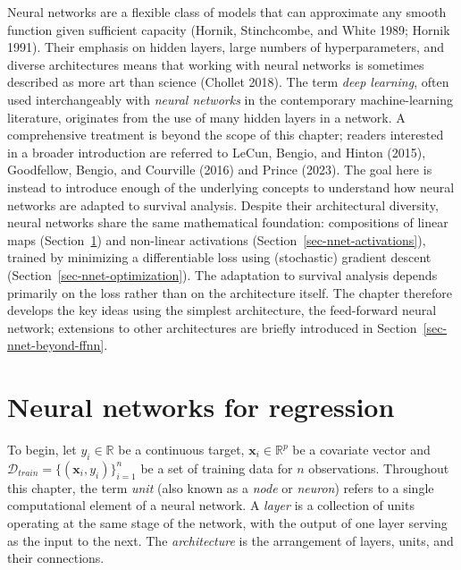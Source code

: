 \documentclass[
  letterpaper,
  krantz2]{style/krantz}
\begin{document}
Neural networks are a flexible class of models
that can approximate any smooth function given sufficient capacity
(Hornik, Stinchcombe, and White 1989; Hornik 1991). Their emphasis on
hidden layers, large numbers of hyperparameters, and diverse
architectures means that working with neural networks is sometimes
described as more art than science (Chollet 2018). The term \emph{deep
learning}, often used interchangeably with \emph{neural networks} in the
contemporary machine-learning literature, originates from the use of
many hidden layers in a network. A comprehensive treatment is beyond the
scope of this chapter; readers interested in a broader introduction are
referred to LeCun, Bengio, and Hinton (2015), Goodfellow, Bengio, and
Courville (2016) and Prince (2023). The goal here is instead to
introduce enough of the underlying concepts to understand how neural
networks are adapted to survival analysis. Despite their architectural
diversity, neural networks share the same mathematical foundation:
compositions of linear maps (Section~\ref{sec-nnet-regression}) and
non-linear activations (Section~\ref{sec-nnet-activations}), trained by
minimizing a differentiable loss using (stochastic) gradient descent
(Section~\ref{sec-nnet-optimization}). The adaptation to survival
analysis depends primarily on the loss rather than on the architecture
itself. The chapter therefore develops the key ideas using the simplest
architecture, the feed-forward neural network; extensions to other
architectures are briefly introduced in
Section~\ref{sec-nnet-beyond-ffnn}.

\section{Neural networks for regression}\label{sec-nnet-regression}

To begin, let \(y_i \in \mathbb{R}\) be a continuous target,
\(\mathbf{x}_i \in \mathbb{R}^p\) be a covariate vector and
\(\mathcal{D}_{train}= \{(\mathbf{x}_i, y_i)\}_{i=1}^n\) be a set of
training data for \(n\) observations. Throughout this chapter, the term
\emph{unit} (also known as a \emph{node} or \emph{neuron}) refers to a
single computational element of a neural
network. A \emph{layer} is a collection of
units operating at the same stage of the network, with the output of one
layer serving as the input to the next. The
\emph{architecture} is the arrangement of layers, units, and their
connections.
\end{document}

